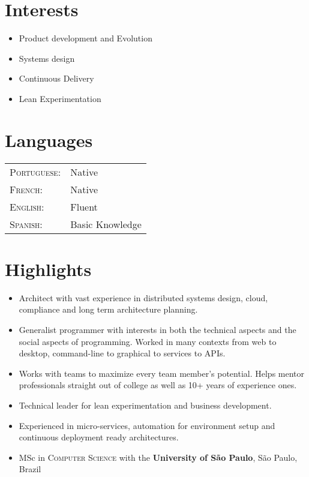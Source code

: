 \documentclass[letter,10pt]{article}
\begin{document}
\begin{multicols}{2}
\section{Interests}
\begin{itemize}
\item Product development and Evolution
\item Systems design
\item Continuous Delivery
\item Lean Experimentation
\end{itemize}

\section{Languages}
\begin{tabular}{p{2.5cm}l}
 \textsc{Portuguese:}&Native\\
 \textsc{French:}&Native\\
 \textsc{English:}&Fluent\\
 \textsc{Spanish:}&Basic Knowledge\\
\end{tabular}
\end{multicols}


\section{Highlights}

\begin{itemize}
\item Architect with vast experience in distributed systems design, cloud, compliance and long term architecture planning.
\item Generalist programmer with interests in both the technical
  aspects and the social aspects of programming. Worked in many contexts from web to desktop, command-line to graphical to services to APIs.
\item Works with teams to maximize every team member's potential. Helps mentor professionals straight out of college as well as 10+ years of experience ones.
\item Technical leader for lean experimentation and business development.
\item Experienced in micro-services, automation for environment setup and continuous deployment ready architectures.
\item MSc in \textsc{Computer Science} with the \textbf{University of São Paulo}, São Paulo, Brazil
\end{itemize}
\end{document}
